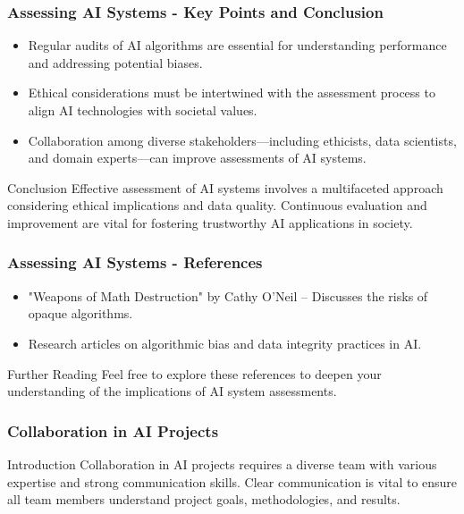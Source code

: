 \documentclass{beamer}
\begin{document}
\begin{frame}[fragile]
    \frametitle{Assessing AI Systems - Key Points and Conclusion}
    \begin{itemize}
        \item Regular audits of AI algorithms are essential for understanding performance and addressing potential biases.
        \item Ethical considerations must be intertwined with the assessment process to align AI technologies with societal values.
        \item Collaboration among diverse stakeholders—including ethicists, data scientists, and domain experts—can improve assessments of AI systems.
    \end{itemize}
    
    \begin{block}{Conclusion}
        Effective assessment of AI systems involves a multifaceted approach considering ethical implications and data quality. Continuous evaluation and improvement are vital for fostering trustworthy AI applications in society.
    \end{block}
\end{frame}

\begin{frame}[fragile]
    \frametitle{Assessing AI Systems - References}
    \begin{itemize}
        \item "Weapons of Math Destruction" by Cathy O'Neil – Discusses the risks of opaque algorithms.
        \item Research articles on algorithmic bias and data integrity practices in AI.
    \end{itemize}

    \begin{block}{Further Reading}
        Feel free to explore these references to deepen your understanding of the implications of AI system assessments.
    \end{block}
\end{frame}

\begin{frame}[fragile]
    \frametitle{Collaboration in AI Projects}
    \begin{block}{Introduction}
        Collaboration in AI projects requires a diverse team with various expertise and strong communication skills. Clear communication is vital to ensure all team members understand project goals, methodologies, and results.
    \end{block}
\end{frame}
\end{document}
